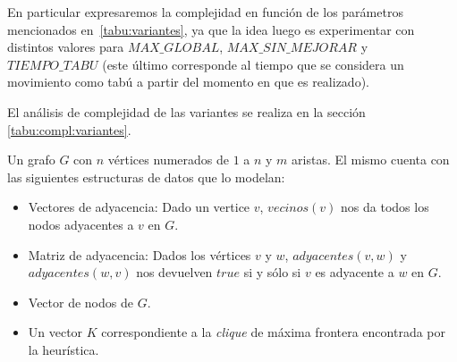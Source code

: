 \par En particular expresaremos la complejidad en funci\'on de los par\'ametros
    mencionados en~\ref{tabu:variantes}, ya que la idea luego es experimentar
    con distintos valores para $MAX\_GLOBAL$, $MAX\_SIN\_MEJORAR$ y $TIEMPO\_TABU$
    (este \'ultimo corresponde al tiempo que se considera un movimiento como tab\'u
    a partir del momento en que es realizado).

\par El an\'alisis de complejidad de las variantes se realiza en la secci\'on
    \ref{tabu:compl:variantes}.

\bigskip

\begin{pseudocodigo}
    \Require Un grafo $G$ con $n$ v\'ertices numerados de $1$ a $n$ y $m$ aristas. El mismo
        cuenta con las siguientes estructuras de datos que lo modelan:
        \begin{itemize}
            \item Vectores de adyacencia: Dado un vertice $v$, $vecinos(v)$ nos da todos los
                nodos adyacentes a $v$ en $G$.

            \item Matriz de adyacencia: Dados los v\'ertices $v$ y $w$, $adyacentes(v,w)$ y
                $adyacentes(w,v)$ nos devuelven $true$ si y s\'olo si $v$ es adyacente
                a $w$ en $G$.

            \item Vector de nodos de $G$.
        \end{itemize}
    \Ensure\Statex
        \begin{itemize}
            \item Un vector $K$ correspondiente a la \emph{clique} de m\'axima frontera
                encontrada por la heur\'istica.


\end{itemize}
\end{pseudocodigo}
